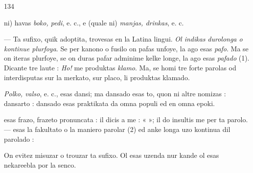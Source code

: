 \begin{VUpage}[138]{134}

\VUcontinue
ni) havas \textit{boko, pedi}, e. c., e (quale ni) \textit{manjas, drinkas}, e. c.\parplein

\nl
{}

 --- Ta sufixo, quik adoptita, trovesas en la Latina\nl
lingui. \textit{Ol indikas}  \textit{durolonga o kontinue plurfoya}. Se per\nl
kanono o fusilo on pafas unfoye, la ago esas \textit{pafo}. Ma se on\nl
iteras plurfoye, se on duras pafar adminime kelke longe, la\nl
ago esas \textit{pafado} (1). Dicante tre laute : \textit{Ho!} me produktas\nl
\textit{klamo}. Ma, se homi tre forte parolas od interdisputas sur\nl
la merkato, sur placo, li produktas klamado.

\textit{Polko, valso}, e. c., esas dansi; ma dansado esas to, quon ni\nl
altre nomizas : dansarto : dansado esas praktikata da omna\nl
populi ed en omna epoki.

 esas frazo, frazeto pronuncata : il dicis a me :\nl
«  »; il do insultis me per ta parolo. --- \nl
esas la fakultato o la maniero parolar (2) ed anke longa\nl
uzo kontinua dil parolado : \nl
{}\nl
{}

On evitez misuzar o trouzar ta sufixo. Ol esas uzenda nur\nl
kande ol esas nekareebla por la senco.


\end{VUpage}
